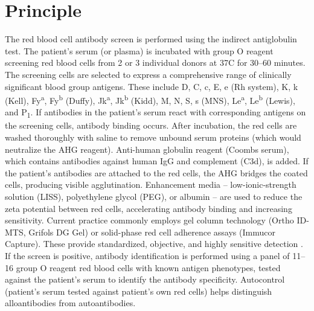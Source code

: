 \section*{Principle}
The red blood cell antibody screen is performed using the indirect antiglobulin test. The patient's serum (or plasma) is incubated with group O reagent screening red blood cells from 2 or 3 individual donors at 37\textdegree{}C for 30--60 minutes. The screening cells are selected to express a comprehensive range of clinically significant blood group antigens. These include D, C, c, E, e (Rh system), K, k (Kell), Fy\textsuperscript{a}, Fy\textsuperscript{b} (Duffy), Jk\textsuperscript{a}, Jk\textsuperscript{b} (Kidd), M, N, S, s (MNS), Le\textsuperscript{a}, Le\textsuperscript{b} (Lewis), and P\textsubscript{1}. If antibodies in the patient's serum react with corresponding antigens on the screening cells, antibody binding occurs. After incubation, the red cells are washed thoroughly with saline to remove unbound serum proteins (which would neutralize the AHG reagent). Anti-human globulin reagent (Coombs serum), which contains antibodies against human IgG and complement (C3d), is added. If the patient's antibodies are attached to the red cells, the AHG bridges the coated cells, producing visible agglutination. Enhancement media -- low-ionic-strength solution (LISS), polyethylene glycol (PEG), or albumin -- are used to reduce the zeta potential between red cells, accelerating antibody binding and increasing sensitivity. Current practice commonly employs gel column technology (Ortho ID-MTS, Grifols DG Gel) or solid-phase red cell adherence assays (Immucor Capture). These provide standardized, objective, and highly sensitive detection \cite{tietz2012textbook}. If the screen is positive, antibody identification is performed using a panel of 11--16 group O reagent red blood cells with known antigen phenotypes, tested against the patient's serum to identify the antibody specificity. Autocontrol (patient's serum tested against patient's own red cells) helps distinguish alloantibodies from autoantibodies.


